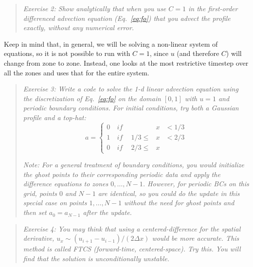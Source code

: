 \documentclass[11pt]{article}
\begin{document}
\begin{quote}
{\em Exercise 2: Show analytically that when you use $C=1$ in the
  first-order differenced advection equation (Eq.~\ref{eq:fo}) that
  you advect the profile exactly, without any numerical error.}
\end{quote}

Keep in mind that, in general, we will be solving a non-linear
system of equations, so it is not possible to run with $C=1$, 
since $u$ (and therefore $C$) will change from zone to zone.
Instead, one looks at the most restrictive timestep over all the
zones and uses that for the entire system.


\begin{quote}
{\em Exercise 3: Write a code to solve the 1-d linear advection equation
  using the discretization of Eq.~\ref{eq:fo} on the domain $[0,1]$ with
  $u=1$ and periodic boundary conditions.  For initial conditions,
  try both a Gaussian profile and a top-hat:}
  \begin{equation}
  a = \left \{
      \begin{array}{lllll}0 & \mathit{~if~~} &         &x& < 1/3 \\
                          1 & \mathit{~if~~} & 1/3 \le &x& < 2/3 \\
                          0 & \mathit{~if~~} & 2/3 \le &x&
      \end{array}
      \right .
  \end{equation}

  {\em Note: For a general treatment of boundary conditions, you would
    initialize the ghost points to their corresponding periodic data
    and apply the difference equations to zones $0, \ldots, N-1$.
    However, for periodic BCs on this grid, points $0$ and $N-1$ are
    identical, so you could do the update in this special case on
    points $1, \ldots, N-1$ without the need for ghost points and then
    set $a_0 = a_{N-1}$ after the update.}

\end{quote}


\begin{quote}
{\em Exercise 4: You may think that using a centered-difference for
  the spatial derivative, $u_x \sim (u_{i+1} - u_{i-1})/(2 \Delta x)$
  would be more accurate.  This method is called FTCS (forward-time,
  centered-space).  Try this.  You will find that the solution is
  unconditionally unstable.  }
\end{quote}
\end{document}
